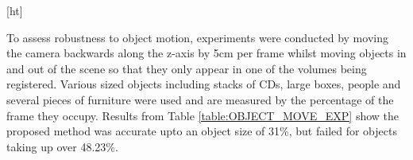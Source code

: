 \begin{table*}[ht]
\hfill
\parbox{.45\linewidth}{
\centering
{}
\caption{Object Motion Test}
\label{table:OBJECT_MOVE_EXP}
}
\end{table*}[ht]


To assess robustness to object motion, experiments were conducted by moving the camera backwards along the z-axis by 5cm per frame whilst moving objects in and out of the scene so that they only appear in one of the volumes being registered. Various sized objects including stacks of CDs, large boxes, people and several pieces of furniture were used and are measured by the percentage of the frame they occupy. Results from Table \ref{table:OBJECT_MOVE_EXP} show the proposed method was accurate upto an object size of 31\%, but failed for objects taking up over 48.23\%.

